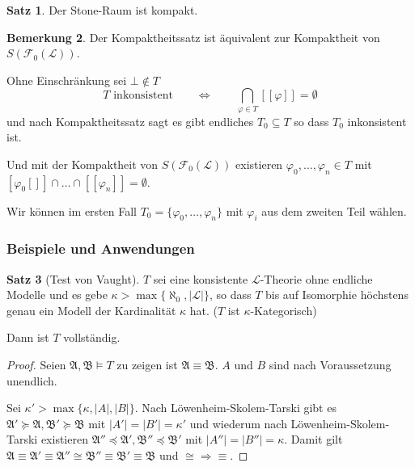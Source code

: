 \documentclass[12pt,parskip=full]{scrartcl}
\newcommand{\abs}[1]{{\left| #1 \right|}}
\theoremstyle{definition}
\newtheorem{theorem}{Satz}[section]
\newtheorem{remark}[theorem]{Bemerkung}
\begin{document}
	\begin{theorem}
		Der Stone-Raum ist kompakt.
	\end{theorem}

	\begin{remark}
		Der Kompaktheitssatz ist äquivalent zur Kompaktheit von $S(\mathcal{F}_0(\mathcal{L}))$.
		
		Ohne Einschränkung sei $\bot \notin T$
		\begin{equation*}
			T \text{ inkonsistent} \qquad\Leftrightarrow\qquad \bigcap_{\varphi \in T} [[\varphi]] = \emptyset
		\end{equation*}
		und nach Kompaktheitssatz sagt es gibt endliches $T_0 \subseteq T$ so dass $T_0$ inkonsistent ist.
		
		Und mit der Kompaktheit von $S(\mathcal{F}_0(\mathcal{L}))$ existieren $\varphi_0, \dots, \varphi_n \in T$ mit $[\varphi_0[]] \cap \dots \cap [[\varphi_n]] = \emptyset$.
		
		Wir können im ersten Fall $T_0 = \{ \varphi_0, \dots, \varphi_n \}$ mit $\varphi_i$ aus dem zweiten Teil wählen.
	\end{remark}

	\subsubsection{Beispiele und Anwendungen}
	
	\begin{theorem}[Test von Vaught]
		$T$ sei eine konsistente $\mathcal{L}$-Theorie ohne endliche Modelle und es gebe $\kappa > \max \{ \aleph_0, \abs{\mathcal{L}} \}$, so dass $T$ bis auf Isomorphie höchstens genau ein Modell der Kardinalität $\kappa$ hat. ($T$ ist $\kappa$-Kategorisch)
		
		Dann ist $T$ vollständig.
	\end{theorem}

	\begin{proof}
		Seien $\mathfrak{A}, \mathfrak{B} \models T$ zu zeigen ist $\mathfrak{A} \equiv \mathfrak{B}$. $A$ und $B$ sind nach Voraussetzung unendlich.
		
		Sei $\kappa' > \max \{ \kappa, \abs{A}, \abs{B} \}$. Nach Löwenheim-Skolem-Tarski gibt es $\mathfrak{A}' \succcurlyeq \mathfrak{A}, \mathfrak{B}' \succcurlyeq \mathfrak{B}$ mit $\abs{A'} = \abs{B'} = \kappa'$ und wiederum nach Löwenheim-Skolem-Tarski existieren $\mathfrak{A}'' \preccurlyeq \mathfrak{A}', \mathfrak{B}'' \preccurlyeq \mathfrak{B}'$ mit $\abs{A''} = \abs{B''} = \kappa$. Damit gilt $\mathfrak{A} \equiv \mathfrak{A}' \equiv \mathfrak{A}'' \cong \mathfrak{B}'' \equiv \mathfrak{B}' \equiv \mathfrak{B}$ und $\cong \Rightarrow \equiv$.
	\end{proof}
\end{document}
